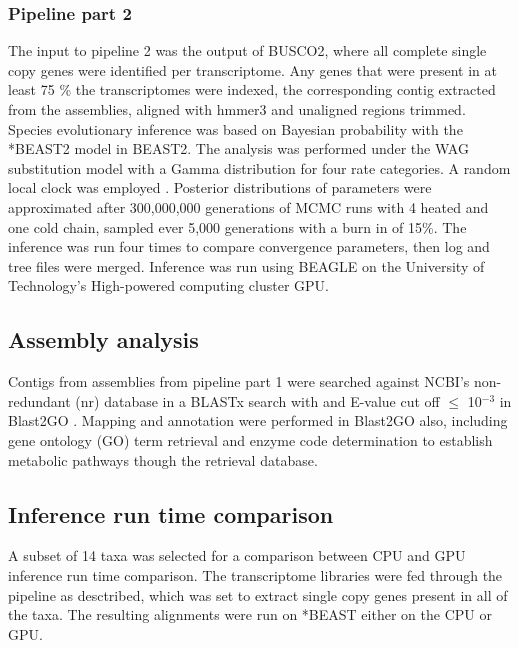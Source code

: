 \documentclass[12pt]{article}
\begin{document}
\subsubsection*{Pipeline part 2}
The input to pipeline 2 was the output of BUSCO2, where all complete single copy genes were identified per transcriptome. 
Any genes that were present in at least 75 \% the transcriptomes were indexed, the corresponding contig extracted from the assemblies, aligned with hmmer3 and unaligned regions trimmed. 
Species evolutionary inference was based on Bayesian probability with the *BEAST2 model in BEAST2. 
The analysis was performed under the WAG substitution model \cite{whelan2001general} with a Gamma distribution for four rate categories. 
A random local clock was employed \cite{drummond2010bayesian}. 
Posterior distributions of parameters were approximated after 300,000,000 generations of MCMC runs with 4 heated and one cold chain, sampled ever 5,000 generations  with a burn in of 15\%. 
The inference was run four times to compare convergence parameters, then log and tree files were merged. 
Inference was run using BEAGLE \cite{ayres2011beagle} on the University of Technology's High-powered computing cluster GPU.

\subsection*{Assembly analysis}
Contigs from assemblies from pipeline part 1 were searched against NCBI's non-redundant (nr) database in a BLASTx search with and E-value cut off $\leq$ 10$^{-3}$ in Blast2GO \cite{conesa2005blast2go}. Mapping and annotation were performed in Blast2GO also, including gene ontology (GO) term retrieval and enzyme code determination to establish metabolic pathways though the retrieval database.
\subsection*{Inference run time comparison}
A subset of 14 taxa was selected for a comparison between CPU and GPU inference run time comparison. 
The transcriptome libraries were fed through the pipeline as desctribed, which was set to extract single copy genes present in all of the taxa. 
The resulting alignments were run on *BEAST either on the CPU or GPU.

\newpage
\end{document}
